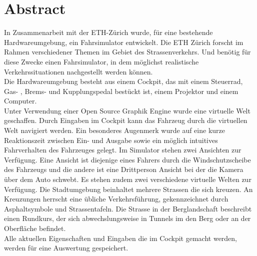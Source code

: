 \section*{Abstract}
In Zusammenarbeit mit der ETH-Zürich wurde, für eine bestehende Hardwareumgebung, ein Fahrsimulator entwickelt. Die ETH Zürich forscht im Rahmen verschiedener Themen im Gebiet des Strassenverkehrs. Und benötig für diese Zwecke einen Fahrsimulator, in dem möglichst realistische Verkehrssituationen nachgestellt werden können. \\
Die Hardwareumgebung besteht aus einem Cockpit, das mit einem Steuerrad, Gas- , Brems- und Kupplungspedal bestückt ist, einem Projektor und einem Computer. \\
Unter Verwendung einer Open Source Graphik Engine wurde eine virtuelle Welt geschaffen. Durch Eingaben im Cockpit kann das Fahrzeug durch die virtuellen Welt navigiert werden. Ein besonderes Augenmerk wurde auf eine kurze Reaktionszeit zwischen Ein- und Ausgabe sowie ein möglich intuitives Fahrverhalten des Fahrzeuges gelegt. Im Simulator stehen zwei Ansichten zur Verfügung. Eine Ansicht ist diejenige eines Fahrers durch die Windschutzscheibe des Fahrzeugs und die andere ist eine Drittperson Ansicht bei der die Kamera über dem Auto schwebt. Es stehen zudem zwei verschiedene virtuelle Welten zur Verfügung. Die Stadtumgebung beinhaltet mehrere Strassen die sich kreuzen. An Kreuzungen herrscht eine übliche Verkehrsführung, gekennzeichnet durch Asphaltsymbole und Strassentafeln. Die Strasse in der Berglandschaft beschreibt einen Rundkurs, der sich abwechslungsweise in Tunnels im den Berg oder an der Oberfläche befindet.\\
Alle aktuellen Eigenschaften und Eingaben die im Cockpit gemacht werden, werden für eine Auswertung gespeichert. 

